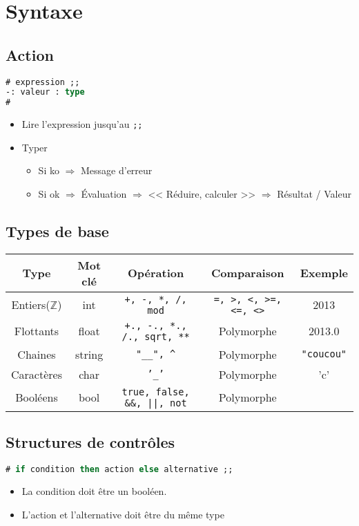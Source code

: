 \documentclass[12pt,a4paper,openany]{book}
\begin{document}
	\chapter{Syntaxe}
	\section{Action}
	\begin{lstlisting}[language=Caml, caption=Syntaxe de base]
# expression ;;
-: valeur : type
#
	\end{lstlisting}
	\begin{itemize}
		\item Lire l'expression jusqu'au \texttt{;;}
		\item Typer
			\begin{itemize}
				\item Si ko $\Rightarrow$ Message d'erreur
				\item Si ok $\Rightarrow$ Évaluation $\Rightarrow$ << Réduire, calculer >> $\Rightarrow$ Résultat / Valeur
			\end{itemize}
	\end{itemize}
	\section{Types de base}
	\begin{tabular}{c|c|c|c|c}
		\textbf{Type} & \textbf{Mot clé }& \textbf{Opération} & \textbf{Comparaison} & \textbf{Exemple} \\
		\hline
		Entiers($\mathbb Z$) & int & \texttt{+, -, *, /, mod}& \texttt{=, >, <, >=, <=, <>}&2013\\
		Flottants & float &\texttt{+., -., *., /., sqrt, **} &Polymorphe  &2013.0\\
		Chaines & string & \texttt{"\_\_", \^} & Polymorphe &\texttt{"coucou"}\\
		Caractères & char &\texttt{'\_'} &\texttt{}Polymorphe & 'c'\\
		Booléens & bool & \texttt{true, false, \&\&, ||, not}&\texttt{}Polymorphe &\\
	\end{tabular}
	\section{Structures de contrôles}
	\begin{lstlisting}[language=Caml, caption=Syntaxe de la condition]
# if condition then action else alternative ;;		
	\end{lstlisting}
	\begin{remarque}
		\begin{itemize}
			\item La condition doit être un booléen.
			\item L'action et l'alternative doit être du même type
		\end{itemize}
	\end{remarque}
\end{document}
